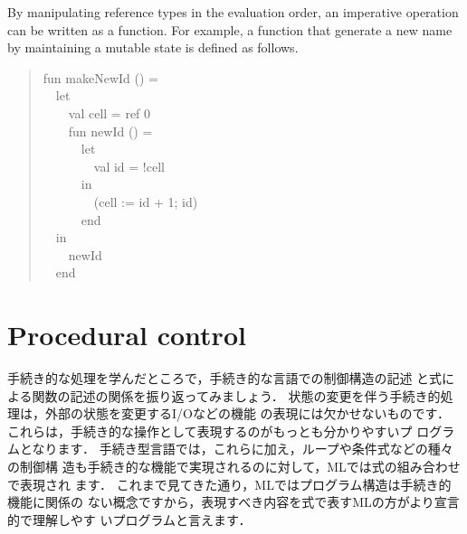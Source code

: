 \documentclass{jbook}
\newif\ifjp
\newcommand{\txt}[2]{#2}
\newcommand{\myem}{\mbox{\ \ }}
\begin{document}
	By manipulating reference types in the evaluation order, 
an imperative operation can be written as a function.
	For example, a function that generate a new name by maintaining
a mutable state is defined as follows.
\begin{tt}
\begin{quote}
fun makeNewId () =\\
\myem let\\
\myem\myem val cell = ref 0\\
\myem\myem fun newId () =\\
\myem\myem\myem let\\
\myem\myem\myem\myem val id = !cell\\
\myem\myem\myem in\\
\myem\myem\myem\myem (cell := id + 1; id)\\
\myem\myem\myem end\\
\myem in\\
\myem\myem newId\\
\myem end
\end{quote}
\end{tt}
\fi%
	
\section{\txt{手続き的制御}{Procedural control}}
\label{sec:tutorialControl}

\ifjp%
	手続き的な処理を学んだところで，手続き的な言語での制御構造の記述
と式による関数の記述の関係を振り返ってみましょう．
	状態の変更を伴う手続き的処理は，外部の状態を変更するI/Oなどの機能
の表現には欠かせないものです．
	これらは，手続き的な操作として表現するのがもっとも分かりやすいプ
ログラムとなります．
	手続き型言語では，これらに加え，ループや条件式などの種々の制御構
造も手続き的な機能で実現されるのに対して，MLでは式の組み合わせで表現され
ます．
	これまで見てきた通り，MLではプログラム構造は手続き的機能に関係の
ない概念ですから，表現すべき内容を式で表すMLの方がより宣言的で理解しやす
いプログラムと言えます．
\end{document}
